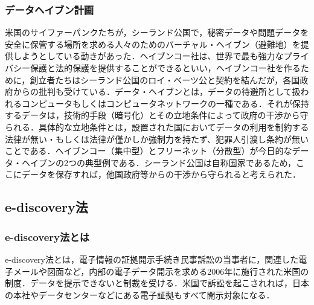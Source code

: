 \subsubsection{データヘイブン計画}
米国のサイファーパンクたちが，シーランド公国で，秘密データや問題データを安全に保管する場所を求める人々のためのバーチャル・ヘイブン（避難地）を提供しようとしている動きがあった．ヘイブンコー社は、世界で最も強力なプライバシー保護と法的保護を提供することができるといい，ヘイブンコー社を作るために，創立者たちはシーランド公国のロイ・ベーツ公と契約を結んだが，各国政府からの批判も受けている\cite{sealand}．データ・ヘイブンとは，データの待避所として扱われるコンピュータもしくはコンピュータネットワークの一種である．それが保持するデータは，技術的手段（暗号化）とその立地条件によって政府の干渉から守られる．具体的な立地条件とは，設置された国においてデータの利用を制約する法律が無い・もしくは法律が僅かしか強制力を持たず、犯罪人引渡し条約が無いことである．ヘイブンコー（集中型）とフリーネット（分散型）が今日的なデータ・ヘイブンの2つの典型例である\cite{dataheaven}．シーランド公国は自称国家であるため，ここにデータを保存すれば，他国政府等からの干渉から守られると考えられた．


\subsection{e-discovery法}
\subsubsection{e-discovery法とは}
e-discovery法とは，電子情報の証拠開示手続き民事訴訟の当事者に，関連した電子メールや図面など，内部の電子データ開示を求める2006年に施行された米国の制度．データを提示できないと制裁を受ける．米国で訴訟を起こされれば，日本の本社やデータセンターなどにある電子証拠もすべて開示対象になる\cite{ediscovery}．

